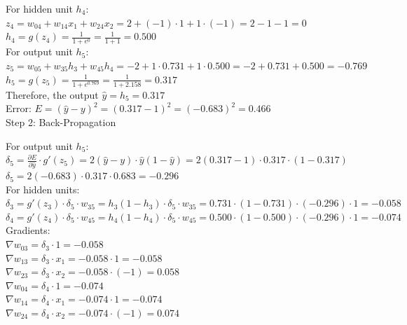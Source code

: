 For hidden unit $h_4$:\\
$z_4 = w_{04} + w_{14}x_1 + w_{24}x_2 = 2 + (-1) \cdot 1 + 1 \cdot (-1) = 2 - 1 - 1 = 0$\\
$h_4 = g(z_4) = \frac{1}{1+e^{0}} = \frac{1}{1+1} = 0.500$\\

For output unit $h_5$:\\
$z_5 = w_{05} + w_{35}h_3 + w_{45}h_4 = -2 + 1 \cdot 0.731 + 1 \cdot 0.500 = -2 + 0.731 + 0.500 = -0.769$\\
$h_5 = g(z_5) = \frac{1}{1+e^{0.769}} = \frac{1}{1+2.158} = 0.317$\\

Therefore, the output $\hat{y} = h_5 = 0.317$\\

Error: $E = (\hat{y} - y)^2 = (0.317 - 1)^2 = (-0.683)^2 = 0.466$\\

Step 2: Back-Propagation

For output unit $h_5$:\\
$\delta_5 = \frac{\partial E}{\partial \hat{y}} \cdot g'(z_5) = 2(\hat{y} - y) \cdot \hat{y}(1-\hat{y}) = 2(0.317 - 1) \cdot 0.317 \cdot (1-0.317)$\\
$\delta_5 = 2(-0.683) \cdot 0.317 \cdot 0.683 = -0.296$\\

For hidden units:\\
$\delta_3 = g'(z_3) \cdot \delta_5 \cdot w_{35} = h_3(1-h_3) \cdot \delta_5 \cdot w_{35} = 0.731 \cdot (1-0.731) \cdot (-0.296) \cdot 1 = -0.058$\\
$\delta_4 = g'(z_4) \cdot \delta_5 \cdot w_{45} = h_4(1-h_4) \cdot \delta_5 \cdot w_{45} = 0.500 \cdot (1-0.500) \cdot (-0.296) \cdot 1 = -0.074$\\

Gradients:\\
$\nabla w_{03} = \delta_3 \cdot 1 = -0.058$\\
$\nabla w_{13} = \delta_3 \cdot x_1 = -0.058 \cdot 1 = -0.058$\\
$\nabla w_{23} = \delta_3 \cdot x_2 = -0.058 \cdot (-1) = 0.058$\\

$\nabla w_{04} = \delta_4 \cdot 1 = -0.074$\\
$\nabla w_{14} = \delta_4 \cdot x_1 = -0.074 \cdot 1 = -0.074$\\
$\nabla w_{24} = \delta_4 \cdot x_2 = -0.074 \cdot (-1) = 0.074$\\

